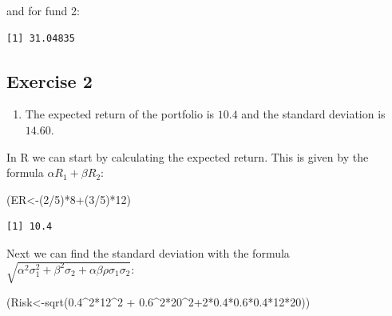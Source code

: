 \documentclass[
  letterpaper,
  DIV=11,
  numbers=noendperiod]{scrreprt}
\newenvironment{Shaded}{\begin{snugshade}}{\end{snugshade}}
\newcommand{\DecValTok}[1]{\textcolor[rgb]{0.68,0.00,0.00}{#1}}
\newcommand{\FloatTok}[1]{\textcolor[rgb]{0.68,0.00,0.00}{#1}}
\newcommand{\FunctionTok}[1]{\textcolor[rgb]{0.28,0.35,0.67}{#1}}
\newcommand{\NormalTok}[1]{\textcolor[rgb]{0.00,0.23,0.31}{#1}}
\newcommand{\OtherTok}[1]{\textcolor[rgb]{0.00,0.23,0.31}{#1}}
\newcommand{\SpecialCharTok}[1]{\textcolor[rgb]{0.37,0.37,0.37}{#1}}
\providecommand{\tightlist}{%
  \setlength{\itemsep}{0pt}\setlength{\parskip}{0pt}}\usepackage{longtable,booktabs,array}
\begin{document}
and for fund 2:

\begin{Shaded}
\end{Shaded}

\begin{verbatim}
[1] 31.04835
\end{verbatim}

\hypertarget{exercise-2-17}{%
\subsection*{Exercise 2}\label{exercise-2-17}}

\begin{blackbox}

\begin{enumerate}
\def\labelenumi{\arabic{enumi}.}
\tightlist
\item
  The expected return of the portfolio is \(10.4\) and the standard
  deviation is \(14.60\).
\end{enumerate}

\end{blackbox}

In R we can start by calculating the expected return. This is given by
the formula \(\alpha R_{1} +\beta R_{2}\):

\begin{Shaded}
\begin{Highlighting}[numbers=left,,]
\NormalTok{(ER}\OtherTok{\textless{}{-}}\NormalTok{(}\DecValTok{2}\SpecialCharTok{/}\DecValTok{5}\NormalTok{)}\SpecialCharTok{*}\DecValTok{8}\SpecialCharTok{+}\NormalTok{(}\DecValTok{3}\SpecialCharTok{/}\DecValTok{5}\NormalTok{)}\SpecialCharTok{*}\DecValTok{12}\NormalTok{)}
\end{Highlighting}
\end{Shaded}

\begin{verbatim}
[1] 10.4
\end{verbatim}

Next we can find the standard deviation with the formula
\(\sqrt{\alpha^2 \sigma_{1}^2+\beta^2 \sigma_{2}+\alpha \beta \rho \sigma_{1} \sigma_{2}}\):

\begin{Shaded}
\begin{Highlighting}[numbers=left,,]
\NormalTok{(Risk}\OtherTok{\textless{}{-}}\FunctionTok{sqrt}\NormalTok{(}\FloatTok{0.4}\SpecialCharTok{\^{}}\DecValTok{2}\SpecialCharTok{*}\DecValTok{12}\SpecialCharTok{\^{}}\DecValTok{2} \SpecialCharTok{+} \FloatTok{0.6}\SpecialCharTok{\^{}}\DecValTok{2}\SpecialCharTok{*}\DecValTok{20}\SpecialCharTok{\^{}}\DecValTok{2}\SpecialCharTok{+}\DecValTok{2}\SpecialCharTok{*}\FloatTok{0.4}\SpecialCharTok{*}\FloatTok{0.6}\SpecialCharTok{*}\FloatTok{0.4}\SpecialCharTok{*}\DecValTok{12}\SpecialCharTok{*}\DecValTok{20}\NormalTok{))}
\end{Highlighting}
\end{Shaded}
\end{document}
